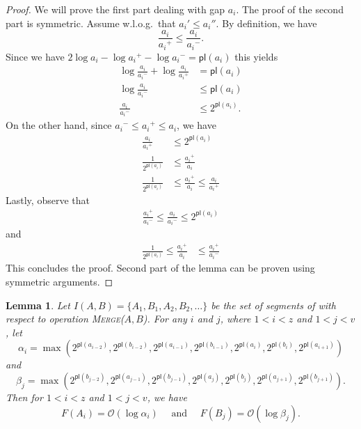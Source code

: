 \documentclass[11pt]{article}
\newcommand{\ens}[1]{\ensuremath{#1}}
\newcommand{\kwUnion}{Merge}
\newcommand{\Unionx}[2]{\mbox{\textsc{\kwUnion(\ensuremath{#1,#2})}}}
\newcommand{\segments}{{\segment}s}
\newcommand{\segment}{segment}
\newcommand{\lasta}{z}
\newcommand{\lastb}{v}
\newcommand{\intsubs}[2]{\ensuremath{I(\set{#1},\set{#2})}}
\newcommand{\intl}[1]{\ensuremath{#1}}
\newcommand{\set}[1]{\ensuremath{#1}}
\newcommand{\agap}[1]{\ensuremath{a_{#1}}}
\newcommand{\leftofa}[1]{\ensuremath{a_{#1}'}}
\newcommand{\rightofa}[1]{\ensuremath{a_{#1}''}}
\newcommand{\bgap}[1]{\ensuremath{b_{#1}}}
\newcommand{\maxgap}[1]{\ensuremath{#1^{+}}}
\newcommand{\mingap}[1]{\ensuremath{#1^{-}}}
\newcommand{\intfun}[1]{\ensuremath{F(\intl #1)}}
\newcommand{\potlossa}[1]{\ens{\mathsf{pl}(\agap{#1})}}
\newcommand{\potlossb}[1]{\ens{\mathsf{pl}(\bgap{#1})}}
\newcommand{\maxpotlossa}[1]{\ensuremath{\alpha_{#1}}}
\newcommand{\maxpotlossb}[1]{\ensuremath{\beta_{#1}}}
\newcounter{count}
\newtheorem{lemma}[count]{Lemma}
\begin{document}
\begin{proof} 
We will prove the first part dealing with gap \agap i. The proof of the second part is symmetric. Assume w.l.o.g.~that $\leftofa i \leq \rightofa i$. By definition, we have
\begin{equation*} 
\label{eq:gapratioupperbound} 
\frac{\agap i}{\maxgap{\agap i}} \leq \frac{\agap i}{\mingap{\agap i}}.
\end{equation*} 
Since we have $2\log\agap i -\log \maxgap{\agap i}- \log \mingap{\agap i} = \potlossa i$ this yields
\begin{align*} 
\log\frac{\agap i}{\mingap{\agap i}} +\log\frac{\agap i}{\maxgap{\agap i}} &= \potlossa i\\
\log\frac{\agap i}{\mingap{\agap i}} &\leq \potlossa i\\
\frac{\agap i}{\mingap{\agap i}} &\leq 2^{\potlossa i}.
\end{align*} 
On the other hand, since $\mingap{\agap i}\leq\maxgap{\agap i}\leq \agap i$, we have
\begin{align*} 
\frac{\agap i}{\maxgap{\agap i}}&\leq 2^{\potlossa i}\\ 
\frac{1}{2^{\potlossa i}} &\leq \frac{\maxgap{\agap i}}{\agap i}\\ 
\frac{1}{2^{\potlossa i}} &\leq \frac{\maxgap{\agap i}}{\agap i} \leq \frac{\agap i}{\maxgap{\agap i}}
\end{align*} 
Lastly, observe that 
\begin{align*} 
\frac{\maxgap{\agap i}}{\mingap{\agap i}} \leq \frac{\agap i}{\mingap{\agap i}} \leq 2^{\potlossa i}
\end{align*} 
and 
\begin{align*} 
\frac{1}{2^{\potlossa i}} \leq \frac{\maxgap{\agap i}}{\agap i} &\leq \frac{\maxgap{\agap i}}{\mingap{\agap i}}
\end{align*} 
This concludes the proof. Second part of the lemma can be proven using symmetric arguments. 

\end{proof} 


\begin{lemma} 
\label{lem:costeqpotloss} 
Let $\intsubs{A}{B} = \{\intl A_1, \intl B_1,\intl A_2, \intl B_2, \ldots\}$ be the set of \segments{} of  with respect to operation \Unionx{A}{B}. For any $i$ and $j$, where $1< i <\lasta$ and $1< j < \lastb$, let 
\[\maxpotlossa i = \max\left(2^{\potlossa{i-2}}, 2^{\potlossb{i-2}},2^{\potlossa{i-1}}, 2^{\potlossb{i-1}}, 2^{\potlossa i},2^{\potlossb i}, 2^{\potlossa{i+1}}\right)\] 
and 
\[\maxpotlossb j = \max\left(2^{\potlossb{j-2}},2^{\potlossa{j-1}}, 2^{\potlossb{j-1}}, 2^{\potlossa j},2^{\potlossb j}, 2^{\potlossa{j+1}},2^{\potlossb{j+1}}\right).\] 
Then for $1< i <\lasta$ and $1< j < \lastb$, we have 
\[\intfun{A_i} = \mathcal O(\log \maxpotlossa i)\quad \mbox{ and } \quad \intfun{B_j} = \mathcal O(\log \maxpotlossb j).\] 
\end{lemma} 
\end{document}
